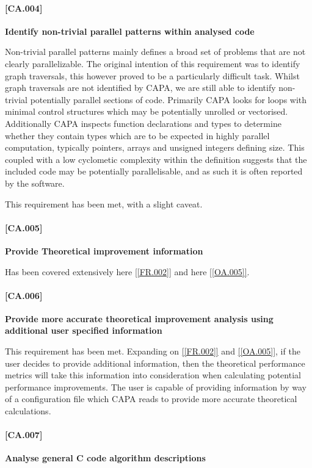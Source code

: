 \paragraph{[CA.004]}
\textbf{Identify non-trivial parallel patterns within analysed code}

Non-trivial parallel patterns mainly defines a broad set of problems that are not clearly
parallelizable. The original intention of this requirement was to identify graph traversals, this
however proved to be a particularly difficult task. Whilst graph traversals are not identified by
CAPA, we are still able to identify non-trivial potentially parallel sections of code. Primarily
CAPA looks for loops with minimal control structures which may be potentially unrolled or
vectorised. Additionally CAPA inspects function declarations and types to determine whether they
contain types which are to be expected in highly parallel computation, typically pointers, arrays
and unsigned integers defining size. This coupled with a low cyclometic complexity within the
definition suggests that the included code may be potentially parallelisable, and as such it is
often reported by the software. 

This requirement has been met, with a slight caveat.


\paragraph{[CA.005]} \label{[CA.006]}
\textbf{Provide Theoretical improvement information}

Has been covered extensively here \ref{[FR.002]} and here \ref{[OA.005]}.

\paragraph{[CA.006]}
\textbf{Provide more accurate theoretical improvement analysis using additional user specified information}

This requirement has been met. Expanding on \ref{[FR.002]} and \ref{[OA.005]}, if the user decides
to provide additional information, then the theoretical performance metrics will take this
information into consideration when calculating potential performance improvements. The user is
capable of providing information by way of a configuration file which CAPA reads to provide more
accurate theoretical calculations. 

\paragraph{[CA.007]}
\textbf{Analyse general C code algorithm descriptions}

